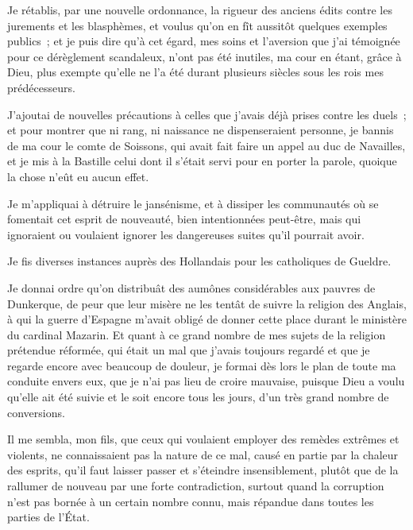 \documentclass[french,twoside]{book} %
\begin{document}
Je rétablis, par une nouvelle ordonnance, la rigueur des anciens édits contre les jurements et les blasphèmes, et voulus qu’on en fît aussitôt quelques exemples publics ; et je puis dire qu’à cet égard, mes soins et l’aversion que j’ai témoignée pour ce dérèglement scandaleux, n’ont pas été inutiles, ma cour en étant, grâce à Dieu, plus exempte qu’elle ne l’a été durant plusieurs siècles sous les rois mes prédécesseurs.\par
J’ajoutai de nouvelles précautions à celles que j’avais déjà prises contre les duels ; et pour montrer que ni rang, ni naissance ne dispenseraient personne, je bannis de ma cour le comte de Soissons, qui avait fait faire un appel au duc de Navailles, et je mis à la Bastille celui dont il s’était servi pour en porter la parole, quoique la chose n’eût eu aucun effet.\par
Je m’appliquai à détruire le jansénisme, et à dissiper les communautés où se fomentait cet esprit de nouveauté, bien intentionnées peut-être, mais qui ignoraient ou voulaient ignorer les dangereuses suites qu’il pourrait avoir.\par
Je fis diverses instances auprès des Hollandais pour les catholiques de Gueldre.\par
Je donnai ordre qu’on distribuât des aumônes considérables aux pauvres de Dunkerque, de peur que leur misère ne les tentât de suivre la religion des Anglais, à qui la guerre d’Espagne m’avait obligé de donner cette place durant le ministère du cardinal Mazarin. Et quant à ce grand nombre de mes sujets de la religion prétendue réformée, qui était un mal que j’avais toujours regardé et que je regarde encore avec beaucoup de douleur, je formai dès lors le plan de toute ma conduite envers eux, que je n’ai pas lieu de croire mauvaise, puisque Dieu a voulu qu’elle ait été suivie et le soit encore tous les jours, d’un très grand nombre de conversions.\par
Il me sembla, mon fils, que ceux qui voulaient employer des remèdes extrêmes et violents, ne connaissaient pas la nature de ce mal, causé en partie par la chaleur des esprits, qu’il faut laisser passer et s’éteindre insensiblement, plutôt que de la rallumer de nouveau par une forte contradiction, surtout quand la corruption n’est pas bornée à un certain nombre connu, mais répandue dans toutes les parties de l’État.\par
\end{document}
